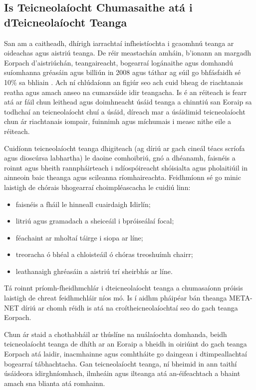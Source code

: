 \begin{multicols}{2}
\subsection{Is Teicneolaíocht Chumasaithe atá i dTeicneolaíocht Teanga}

San am a caitheadh, dhírigh iarrachtaí infheistíochta i gcaomhnú teanga ar oideachas agus aistriú teanga. De réir meastachán amháin, b’ionann an margadh Eorpach d’aistriúchán, teangaireacht, bogearraí logánaithe agus domhandú suíomhanna gréasáin agus  billiún in 2008 agus táthar ag súil go bhfásfaidh sé 10\% sa bhliain \cite{EC3}.  Ach ní chlúdaíonn an figiúr seo ach cuid bheag de riachtanais reatha agus amach anseo na cumarsáide idir teangacha. Is é an réiteach is fearr atá ar fáil chun leithead agus doimhneacht úsáid teanga a chinntiú san Eoraip sa todhchaí an teicneolaíocht chuí a úsáid, díreach mar a úsáidimid teicneolaíocht chun ár riachtanais iompair, fuinnimh agus míchumais i measc nithe eile a réiteach.

Cuidíonn teicneolaíocht teanga dhigiteach (ag díriú ar gach cineál téacs scríofa agus dioscúrsa labhartha) le daoine comhoibriú, gnó a dhéanamh, faisnéis a roinnt agus bheith rannpháirteach i ndíospóireacht shóisialta agus pholaitiúil in ainneoin baic theanga agus scileanna ríomhaireachta. Feidhmíonn sé go minic laistigh de chórais bhogearraí choimpléascacha le cuidiú linn:

\begin{itemize}
\item faisnéis a fháil le hinneall cuairdaigh Idirlín;
\item litriú agus gramadach a sheiceáil i bpróiseálaí focal;
\item féachaint ar mholtaí táirge i siopa ar líne;
\item treoracha ó bhéal a chloisteáil ó chóras treoshuímh chairr;
\item leathanaigh ghréasáin a aistriú trí sheirbhís ar líne. 
\end{itemize}

Tá roinnt príomh-fheidhmchlár i dteicneolaíocht teanga a chumasaíonn próisis laistigh de chreat feidhmchláir níos mó. Is í aidhm pháipéar bán theanga META-NET díriú ar chomh réidh is atá na croítheicneolaíochtaí seo do gach teanga Eorpach.  


Chun ár staid a chothabháil ar thúslíne na nuálaíochta domhanda, beidh teicneolaíocht teanga de dhíth ar an Eoraip a bheidh in oiriúint do gach teanga Eorpach atá laidir, inacmhainne agus comhtháite go daingean i dtimpeallachtaí bogearraí tábhachtacha. Gan teicneolaíocht teanga, ní bheimid in ann taithí úsáideora idirghníomhach, ilmheáin agus ilteanga atá an-éifeachtach a bhaint amach sna blianta atá romhainn.


\end{multicols}
